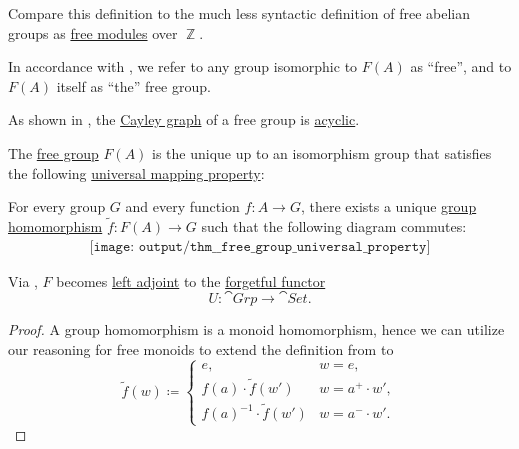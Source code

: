 \begin{comments}
  \item Compare this definition to the much less syntactic definition of free abelian groups as \hyperref[def:free_semimodule]{free modules} over \( \BbbZ \).

  \item In accordance with , we refer to any group isomorphic to \( F(A) \) as \enquote{free}, and to \(F(A) \) itself as \enquote{the} free group.

  \item As shown in , the \hyperref[def:cayley_graph]{Cayley graph} of a free group is \hyperref[def:acyclic_graph]{acyclic}.
\end{comments}

\begin{theorem}\label{thm:free_group_universal_property}
  The \hyperref[def:free_group]{free group} \( F(A) \) is the unique up to an isomorphism group that satisfies the following \hyperref[rem:universal_mapping_property]{universal mapping property}:
  \begin{displayquote}
    For every group \( G \) and every function \( f: A \to G \), there exists a unique \hyperref[def:group/homomorphism]{group homomorphism} \( \widetilde{f}: F(A) \to G \) such that the following diagram commutes:
    \begin{equation}\label{eq:thm:free_group_universal_property/diagram}
      \begin{aligned}
        \texttt{[image: output/thm\_\_free\_group\_universal\_property]}
      \end{aligned}
    \end{equation}
  \end{displayquote}
\end{theorem}
\begin{comments}
  \item Via , \( F \) becomes \hyperref[def:category_adjunction]{left adjoint} to the \hyperref[def:concrete_category]{forgetful functor}
  \begin{equation*}
    U: \cat{Grp} \to \cat{Set}.
  \end{equation*}
\end{comments}
\begin{proof}
  A group homomorphism is a monoid homomorphism, hence we can utilize our reasoning for free monoids to extend the definition from  to
  \begin{equation*}
    \widetilde{f}(w) \coloneqq \begin{cases}
      e,                      &w = e, \\
      f(a) \cdot \widetilde{f}(w')      &w = a^+ \cdot w', \\
      f(a)^{-1} \cdot \widetilde{f}(w') &w = a^- \cdot w'.
    \end{cases}
  \end{equation*}
\end{proof}

